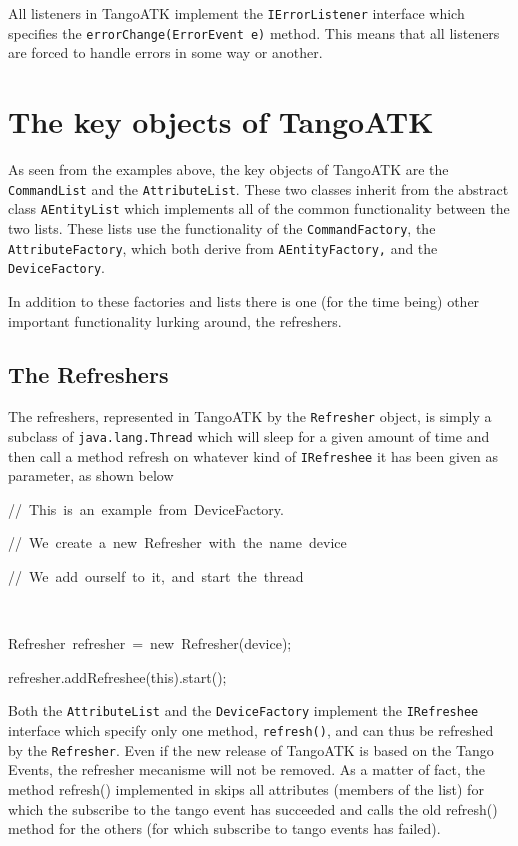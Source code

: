 All listeners in TangoATK implement the \texttt{IErrorListener} interface
which specifies the \texttt{errorChange(ErrorEvent e)} method. This
means that all listeners are forced to handle errors in some way or
another.

\section{The key objects of TangoATK}

As seen from the examples above, the key objects of TangoATK are the
\texttt{CommandList} and the \texttt{AttributeList}.
These two classes inherit from the abstract class \texttt{AEntityList}
which implements all of the common functionality between the two lists.
These lists use the functionality of the \texttt{CommandFactory},
the \texttt{AttributeFactory}, which both derive from \texttt{AEntityFactory,}
and the \texttt{DeviceFactory}.

In addition to these factories and lists there is one (for the time
being) other important functionality lurking around, the refreshers.

\subsection{The Refreshers}

The refreshers, represented in TangoATK by the \texttt{Refresher}
object, is simply a subclass of \texttt{java.lang.Thread} which will
sleep for a given amount of time and then call a method refresh on
whatever kind of \texttt{IRefreshee} it has been given as parameter,
as shown below


\begin{lyxcode}
//~This~is~an~example~from~DeviceFactory.

//~We~create~a~new~Refresher~with~the~name~\textquotedbl{}device\textquotedbl{}

//~We~add~ourself~to~it,~and~start~the~thread

~

Refresher~refresher~=~new~Refresher(\textquotedbl{}device\textquotedbl{});

refresher.addRefreshee(this).start();

\end{lyxcode}


Both the \texttt{AttributeList} and the \texttt{DeviceFactory}
implement the \texttt{IRefreshee} interface which specify only one
method, \texttt{refresh()}, and can thus be refreshed by the \texttt{Refresher}.
Even if the new release of TangoATK is based on the Tango Events,
the refresher mecanisme will not be removed. As a matter of fact,
the method refresh() implemented in  skips all
attributes (members of the list) for which the subscribe
to the tango event has succeeded and calls the old refresh() method
for the others (for which subscribe to tango events has failed). 

